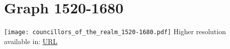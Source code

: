 \section{Graph 1520-1680}
\texttt{[image: councillors\_of\_the\_realm\_1520-1680.pdf]}
Higher resolution available in: \url{URL}